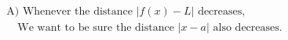\documentclass[preview]{standalone}
\begin{document}
\begin{align*}
\text{A) Whenever the distance } |f(x) - L| \text{ decreases,} \\
                             \quad \text{We want to be sure the distance } |x - a| \text{ also decreases.}
\end{align*}
\end{document}
